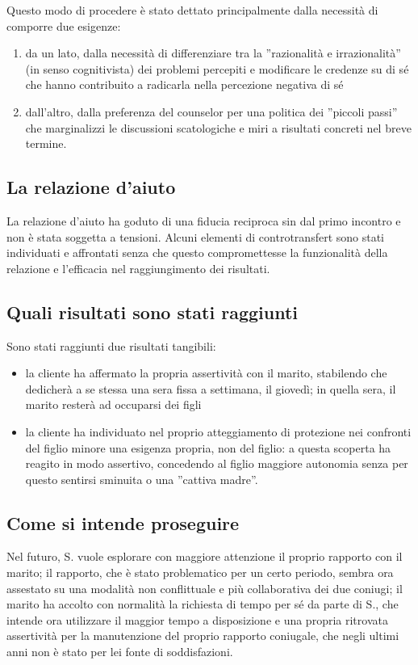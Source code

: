 Questo modo di procedere è stato dettato principalmente dalla necessità di comporre due esigenze:
\begin{enumerate}
\item  da un lato, dalla necessità di differenziare tra la ''razionalità e irrazionalità'' (in senso cognitivista) dei problemi percepiti e modificare le credenze su di sé che hanno contribuito a radicarla nella percezione negativa di sé
\item dall'altro, dalla preferenza del counselor per una politica dei ''piccoli passi'' che marginalizzi le discussioni scatologiche e miri a risultati concreti nel breve termine.
\end{enumerate}

\subsection{La relazione d'aiuto}
\label{ss:relazione}
La relazione d'aiuto ha goduto di una fiducia reciproca sin dal primo incontro e non è stata soggetta a tensioni. Alcuni elementi di controtransfert sono stati individuati e affrontati senza che questo compromettesse la funzionalità della relazione e l'efficacia nel raggiungimento dei risultati.

\subsection{Quali risultati sono stati raggiunti}
\label{ss:risultati}

Sono stati raggiunti due risultati tangibili:
\begin{itemize}
\item la cliente ha affermato la propria assertività con il marito, stabilendo che dedicherà a se stessa una sera fissa a settimana, il giovedì; in quella sera, il marito resterà ad occuparsi dei figli
\item la cliente ha individuato nel proprio atteggiamento di protezione nei confronti del figlio minore una esigenza propria, non del figlio: a questa scoperta ha reagito in modo assertivo, concedendo al figlio maggiore autonomia senza per questo sentirsi sminuita o una ''cattiva madre''.
\end{itemize}

\subsection{Come si intende proseguire}
\label{ss:futuro}
Nel futuro, S. vuole esplorare con maggiore attenzione il proprio rapporto con il marito; il rapporto, che è stato problematico per un certo periodo, sembra ora assestato su una modalità non conflittuale e più collaborativa dei due coniugi; il marito ha accolto con normalità la richiesta di tempo per sé da parte di S., che intende ora utilizzare il maggior tempo a disposizione e una propria ritrovata assertività per la manutenzione del proprio rapporto coniugale, che negli ultimi anni non è stato per lei fonte di soddisfazioni.

